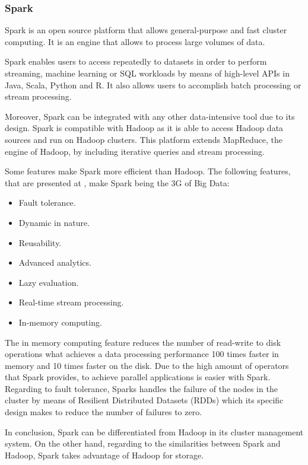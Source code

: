 \subsubsection{Spark}

Spark is an open source platform that allows general-purpose and fast cluster computing. It is an engine that allows to process large volumes of data.

Spark enables users to access repeatedly to datasets in order to perform streaming, machine learning or SQL workloads by means of high-level APIs in Java, Scala, Python and R. It also allows users to accomplish batch processing or stream processing.

Moreover, Spark can be integrated with any other data-intensive tool due to its design. Spark is compatible with Hadoop as it is able to access Hadoop data sources and run on Hadoop clusters. This platform extends MapReduce, the engine of Hadoop, by including iterative queries and stream processing.

Some features make Spark more efficient than Hadoop. The following features, that are presented at \cite{sparkwebsite}, make Spark being the 3G of Big Data:

\begin{itemize}

\item Fault tolerance.
\item Dynamic in nature.
\item Reusability.
\item Advanced analytics.
\item Lazy evaluation.
\item Real-time stream processing.
\item In-memory computing.

\end{itemize}

The in memory computing feature reduces the number of read-write to disk operations what achieves a data processing performance 100 times faster in memory and 10 times faster on the disk. Due to the high amount of operators that Spark provides, to achieve parallel applications is easier with Spark. Regarding to fault tolerance, Sparks handles the failure of the nodes in the cluster by means of Resilient Distributed Datasets (RDDs) which its specific design makes to reduce the number of failures to zero.

In conclusion, Spark can be differentiated from Hadoop in its cluster management system. On the other hand, regarding to the similarities between Spark and Hadoop, Spark takes advantage of Hadoop for storage.

